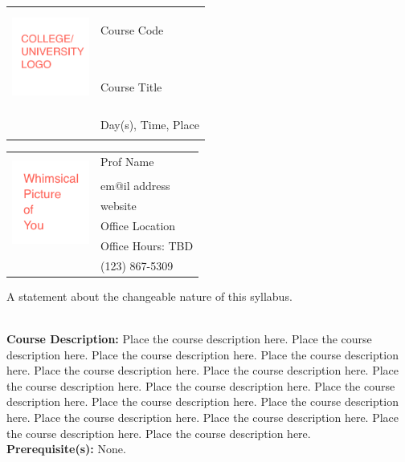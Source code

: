 \documentclass[11pt]{article}
\begin{document}
\begin{tabular}{ l l }
  \multirow{3}{*}{\includegraphics[height=1.25in,width=1in]{logo_blank.png}} & \LARGE Course Code \\\\
  & \LARGE Course Title \\\\
  & \LARGE Day(s), Time, Place \\\\
\end{tabular}
\vspace{10mm}

\begin{tabular}{ l l }
  \multirow{6}{*}{\includegraphics[height=1.25in,width=1in]{pic_blank.png}} & \large Prof Name \\\\
  & \large em@il address \\
  & \large website \\
  & \large Office Location \\
  & \large Office Hours: TBD \\
  & \large (123) 867-5309 \\
\end{tabular}
\vspace{5mm}
\begin{center} A statement about the changeable nature of this syllabus. \\
\end{center}

\textbf {\large \\ Course Description:} Place the course description here. Place the course description here. Place the course description here. Place the course description here. Place the course description here. Place the course description here. Place the course description here. Place the course description here. Place the course description here. Place the course description here. Place the course description here. Place the course description here. Place the course description here. Place the course description here. Place the course description here. \\
\textbf {Prerequisite(s):} None.
\end{document}
